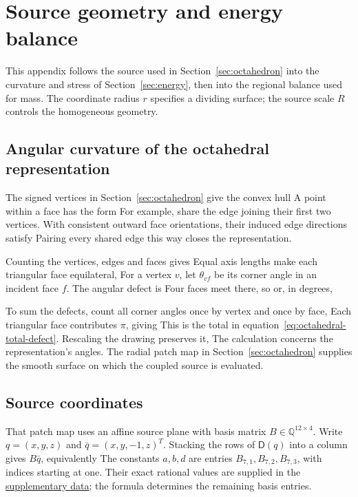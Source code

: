 \section{Source geometry and energy balance}
\label{app:source-reduction}
This appendix follows the source used in Section~\ref{sec:octahedron} into the curvature and stress of Section~\ref{sec:energy}, then into the regional balance used for mass. The coordinate radius $r$ specifies a dividing surface; the source scale $R$ controls the homogeneous geometry.

\subsection{Angular curvature of the octahedral representation}
The signed vertices in Section~\ref{sec:octahedron} give the convex hull
\CurvatureOctahedralHullDisplay
A point within a face has the form
\CurvatureFaceAverageDisplay
For example,
\CurvatureFacePairExampleDisplay
share the edge joining their first two vertices. With consistent outward face orientations, their induced edge directions satisfy
\CurvatureEdgeCancellationExampleDisplay
Pairing every shared edge this way closes the representation.

Counting the vertices, edges and faces gives
\CurvatureCountingExampleDisplay
Equal axis lengths make each triangular face equilateral,
\CurvatureEquilateralExampleDisplay
For a vertex $v$, let $\theta_{vf}$ be its corner angle in an incident face $f$. The angular defect is
\CurvatureAngularDefectDisplay
Four faces meet there, so
\CurvatureRegularDefectDisplay
or, in degrees,
\CurvatureAngleExampleDisplay

To sum the defects, count all corner angles once by vertex and once by face,
\CurvatureAngleCountingDisplay
Each triangular face contributes $\pi$, giving
\CurvatureInvariantDefectDisplay
This is the total in equation~\eqref{eq:octahedral-total-defect}. Rescaling the drawing preserves it,
\CurvatureScaleExampleDisplay
The calculation concerns the representation's angles. The radial patch map in Section~\ref{sec:octahedron} supplies the smooth surface on which the coupled source is evaluated.

\subsection{Source coordinates}
\label{app:source-coordinates}
That patch map uses an affine source plane with basis matrix $B\in\mathbb Q^{12\times4}$. Write $q=(x,y,z)$ and $\bar q=(x,y,-1,z)^T$. Stacking the rows of $\mathsf D(q)$ into a column gives $B\bar q$, equivalently
\SourceBasisDisplay
The constants $a,b,d$ are entries $B_{7,1},B_{7,2},B_{7,3}$, with indices starting at one. Their exact rational values are supplied in the \href{retained-source-exact-data.json}{supplementary data}; the formula determines the remaining basis entries.

